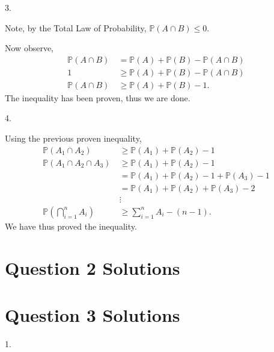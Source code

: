 \documentclass{article}
\begin{document}
3.

Note, by the Total Law of Probability, $\mathbb{P}(A\cap B) \leq 0$.

Now observe,
\begin{align*}
    \mathbb{P}(A\cap B) & = \mathbb{P}(A) +\mathbb{P}(B) - \mathbb{P}(A\cap B)\\    
    1 &\geq \mathbb{P}(A) +\mathbb{P}(B) - \mathbb{P}(A\cap B)\\
    \mathbb{P}(A\cap B)\ &\geq \mathbb{P}(A) +\mathbb{P}(B) - 1\mbox{.}
\end{align*}
\hspace*{6mm} The inequality has been proven, thus we are done.

4.

Using the previous proven inequality,
\begin{align*}
    \mathbb{P}(A_1\cap A_2)\ &\geq \mathbb{P}(A_1) + \mathbb{P}(A_2) - 1\\
    \mathbb{P}(A_1\cap A_2\cap A_3)\ &\geq \mathbb{P}(A_1) + \mathbb{P}(A_2) - 1\\
    &= \mathbb{P}(A_1) +\mathbb{P}(A_2) - 1 +  \mathbb{P}(A_3) - 1\\
    &= \mathbb{P}(A_1) +\mathbb{P}(A_2) +  \mathbb{P}(A_3) - 2\\
    &\vdots\\
    \mathbb{P}(\bigcap_{i = 1}^n A_i)\ &\geq \sum_{i = 1}^{n} A_i - (n-1)\mbox{.}
\end{align*}
\hspace*{6mm} We have thus proved the inequality. 

\section*{Question 2 Solutions} %


\section*{Question 3 Solutions} %
1.
\end{document}
